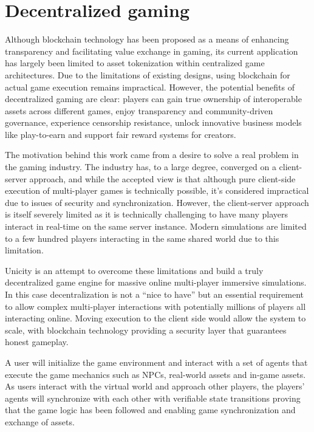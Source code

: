 \documentclass{article}
\begin{document}
\section{Decentralized gaming}

Although blockchain technology has been proposed as a means of enhancing transparency and facilitating value exchange in gaming, its current application has largely been limited to asset tokenization within centralized game architectures. Due to the limitations of existing designs, using blockchain for actual game execution remains impractical. However, the potential benefits of decentralized gaming are clear: players can gain true ownership of interoperable assets across different games, enjoy transparency and community-driven governance, experience censorship resistance, unlock innovative business models like play-to-earn and support fair reward systems for creators.


The motivation behind this work came from a desire to solve a real problem in the gaming industry. The industry has, to a large degree, converged on a client-server approach, and while the accepted view is that although pure client-side execution of multi-player games is technically possible, it's considered impractical due to issues of security and synchronization. However, the client-server approach is itself severely limited as it is technically challenging to have many players interact in real-time on the same server instance. Modern simulations are limited to a few hundred players interacting in the same shared world due to this limitation.


Unicity is an attempt to overcome these limitations and build a truly decentralized game engine for massive online multi-player immersive simulations. In this case decentralization is not a ``nice to have'' but an essential requirement to allow complex multi-player interactions with potentially millions of players all interacting online. Moving execution to the client side would allow the system to scale, with blockchain technology providing a security layer that guarantees honest gameplay.


A user will initialize the game environment and interact with a set of agents that execute the game mechanics such as NPCs, real-world assets and in-game assets. As users interact with the virtual world and approach other players, the players' agents will synchronize with each other with verifiable state transitions proving that the game logic has been followed and enabling game synchronization and exchange of assets.
\end{document}
